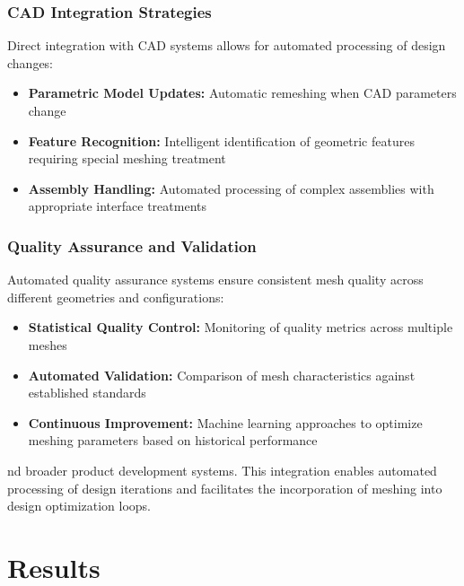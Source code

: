 \documentclass{book}
\begin{document}
\begin{itemize}[leftmargin=*,label=\textbullet]
\begin{itemize}
\subsection{CAD Integration Strategies}

Direct integration with CAD systems allows for automated processing of design changes:
\begin{itemize}[leftmargin=*,label=\textbullet]
    \item \textbf{Parametric Model Updates:} Automatic remeshing when CAD parameters change
    \item \textbf{Feature Recognition:} Intelligent identification of geometric features requiring special meshing treatment
    \item \textbf{Assembly Handling:} Automated processing of complex assemblies with appropriate interface treatments
\end{itemize}

\subsection{Quality Assurance and Validation}

Automated quality assurance systems ensure consistent mesh quality across different geometries and configurations:
\begin{itemize}[leftmargin=*,label=\textbullet]
    \item \textbf{Statistical Quality Control:} Monitoring of quality metrics across multiple meshes
    \item \textbf{Automated Validation:} Comparison of mesh characteristics against established standards
    \item \textbf{Continuous Improvement:} Machine learning approaches to optimize meshing parameters based on historical performance
\end{itemize}

nd broader product development systems. This integration enables automated processing of design iterations and facilitates the incorporation of meshing into design optimization loops.



\chapter{Results}


\end{itemize}
\end{itemize}
\end{document}
